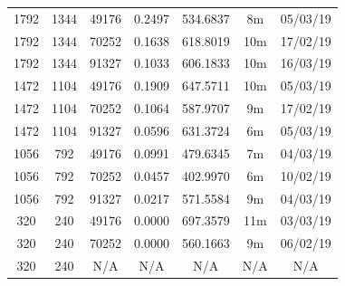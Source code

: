 \documentclass[11pt,a4paper]{report}
\begin{document}
\begin{itemize}
\begin{center}
\begin{tabular}{ c c c | c | c c c }
  1792 & 1344 & 49176 & 0.2497 & 534.6837 & 8m & 05/03/19 \\
  1792 & 1344 & 70252 & 0.1638 & 618.8019 & 10m & 17/02/19 \\
  1792 & 1344 & 91327 & 0.1033 & 606.1833 & 10m & 16/03/19 \\
  1472 & 1104 & 49176 & 0.1909 & 647.5711 & 10m & 05/03/19 \\
  1472 & 1104 & 70252 & 0.1064 & 587.9707 & 9m & 17/02/19 \\
  1472 & 1104 & 91327 & 0.0596 & 631.3724 & 6m & 05/03/19 \\
  1056 & 792 & 49176 & 0.0991 & 479.6345 & 7m & 04/03/19 \\
  1056 & 792 & 70252 & 0.0457 & 402.9970 & 6m & 10/02/19 \\
  1056 & 792 & 91327 & 0.0217 & 571.5584 & 9m & 04/03/19 \\
  320 & 240 & 49176 & 0.0000 & 697.3579 & 11m & 03/03/19 \\
  320 & 240 & 70252 & 0.0000 & 560.1663 & 9m & 06/02/19 \\
  320 & 240 & N/A & N/A & N/A & N/A & N/A \\
  \end{tabular}
  \end{center}


\end{itemize}
\end{document}

